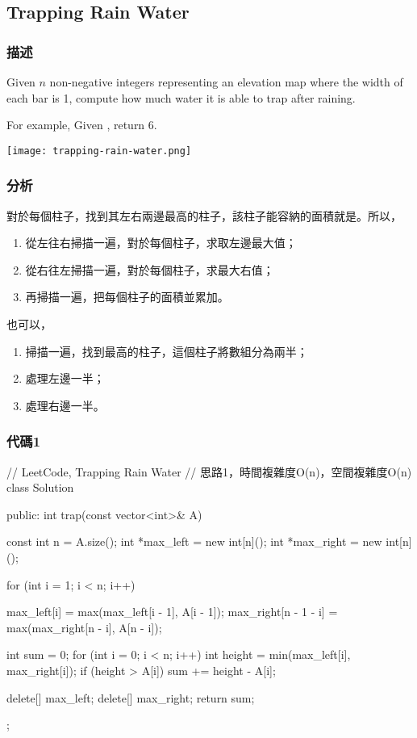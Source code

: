 \subsection{Trapping Rain Water} %
\label{sec:trapping-rain-water}


\subsubsection{描述}
Given $n$ non-negative integers representing an elevation map where the width of each bar is 1, compute how much water it is able to trap after raining.

For example, 
Given \code{\[0,1,0,2,1,0,1,3,2,1,2,1\]}, return 6.

\begin{center}
\texttt{[image: trapping-rain-water.png]}\\
\label{fig:trapping-rain-water}
\end{center}


\subsubsection{分析}
對於每個柱子，找到其左右兩邊最高的柱子，該柱子能容納的面積就是。所以，
\begin{enumerate}
\item 從左往右掃描一遍，對於每個柱子，求取左邊最大值；
\item 從右往左掃描一遍，對於每個柱子，求最大右值；
\item 再掃描一遍，把每個柱子的面積並累加。
\end{enumerate}

也可以，
\begin{enumerate}
\item 掃描一遍，找到最高的柱子，這個柱子將數組分為兩半；
\item 處理左邊一半；
\item 處理右邊一半。
\end{enumerate}


\subsubsection{代碼1}
\begin{Code}
// LeetCode, Trapping Rain Water
// 思路1，時間複雜度O(n)，空間複雜度O(n)
class Solution {
public:
    int trap(const vector<int>& A) {
        const int n = A.size();
        int *max_left = new int[n]();
        int *max_right = new int[n]();

        for (int i = 1; i < n; i++) {
            max_left[i] = max(max_left[i - 1], A[i - 1]);
            max_right[n - 1 - i] = max(max_right[n - i], A[n - i]);

        }

        int sum = 0;
        for (int i = 0; i < n; i++) {
            int height = min(max_left[i], max_right[i]);
            if (height > A[i]) {
                sum += height - A[i];
            }
        }

        delete[] max_left;
        delete[] max_right;
        return sum;
    }
};
\end{Code}


